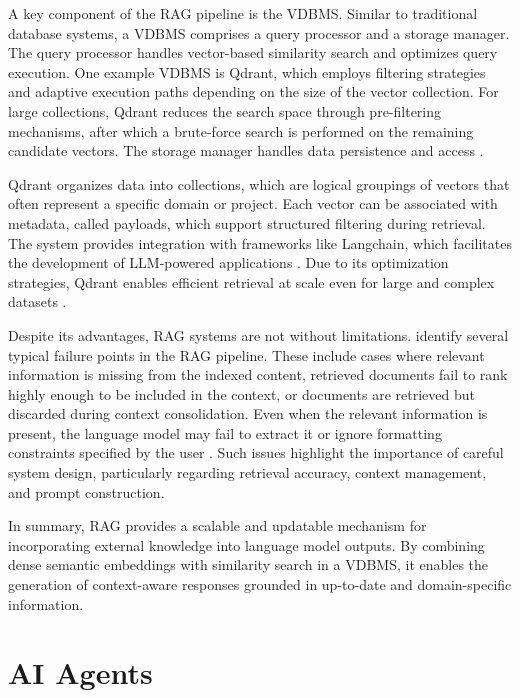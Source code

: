 \documentclass[a4paper,oneside,bibliography=totoc]{scrbook}
\begin{document}
A key component of the \ac{RAG} pipeline is the \ac{VDBMS}. Similar to traditional database systems, a \ac{VDBMS} comprises a query processor and a storage manager. The query processor handles vector-based similarity search and optimizes query execution. One example \ac{VDBMS} is Qdrant, which employs filtering strategies and adaptive execution paths depending on the size of the vector collection. For large collections, Qdrant reduces the search space through pre-filtering mechanisms, after which a brute-force search is performed on the remaining candidate vectors. The storage manager handles data persistence and access \cite{Pan2024,Qdrant2025}.

Qdrant organizes data into collections, which are logical groupings of vectors that often represent a specific domain or project. Each vector can be associated with metadata, called payloads, which support structured filtering during retrieval. The system provides integration with frameworks like Langchain, which facilitates the development of LLM-powered applications \cite{LangChain2025d}. Due to its optimization strategies, Qdrant enables efficient retrieval at scale even for large and complex datasets \cite{Pan2024,Qdrant2025}.

Despite its advantages, RAG systems are not without limitations. \citet{Barnett2024} identify several typical failure points in the RAG pipeline. These include cases where relevant information is missing from the indexed content, retrieved documents fail to rank highly enough to be included in the context, or documents are retrieved but discarded during context consolidation. Even when the relevant information is present, the language model may fail to extract it or ignore formatting constraints specified by the user \cite{Barnett2024}. Such issues highlight the importance of careful system design, particularly regarding retrieval accuracy, context management, and prompt construction.

In summary, \ac{RAG} provides a scalable and updatable mechanism for incorporating external knowledge into language model outputs. By combining dense semantic embeddings with similarity search in a \ac{VDBMS}, it enables the generation of context-aware responses grounded in up-to-date and domain-specific information.

\section{AI Agents}
\label{sec:ai_agents}
\end{document}
